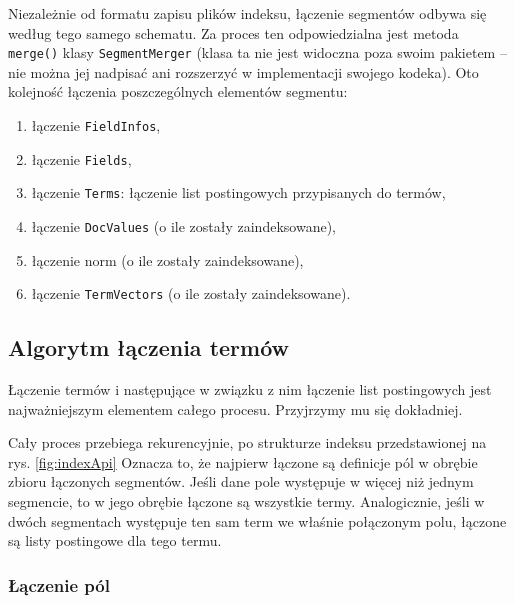 Niezależnie od formatu zapisu plików indeksu, łączenie segmentów odbywa się według tego samego schematu. Za proces ten odpowiedzialna jest metoda \texttt{merge()} klasy \texttt{SegmentMerger} (klasa ta nie jest widoczna poza swoim pakietem -- nie można jej nadpisać ani rozszerzyć w implementacji swojego kodeka). Oto kolejność łączenia poszczególnych elementów segmentu:
\begin{enumerate}
 \item łączenie \texttt{FieldInfos},
 \item łączenie \texttt{Fields},
 \item łączenie \texttt{Terms}: łączenie list postingowych przypisanych do termów,
 \item łączenie \texttt{DocValues} (o ile zostały zaindeksowane),
 \item łączenie norm (o ile zostały zaindeksowane),
 \item łączenie \texttt{TermVectors} (o ile zostały zaindeksowane).
\end{enumerate}

\subsection{Algorytm łączenia termów}

Łączenie termów i następujące w związku z nim łączenie list postingowych jest najważniejszym elementem całego procesu. Przyjrzymy mu się dokładniej.

Cały proces przebiega rekurencyjnie, po strukturze indeksu przedstawionej na rys. \ref{fig:indexApi} Oznacza to, że najpierw łączone są definicje pól w obrębie zbioru łączonych segmentów. Jeśli dane pole występuje w więcej niż jednym segmencie, to w jego obrębie łączone są wszystkie termy. Analogicznie, jeśli w dwóch segmentach występuje ten sam term we właśnie połączonym polu, łączone są listy postingowe dla tego termu.

\subsubsection{Łączenie pól}

